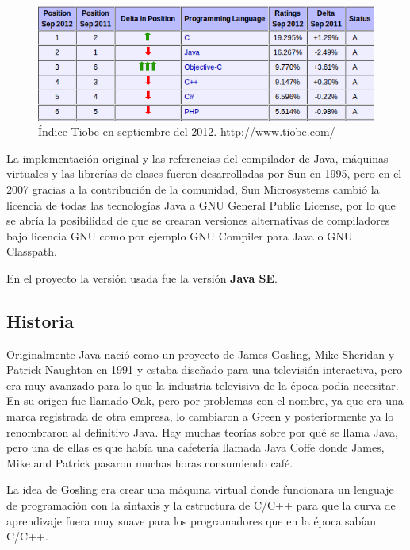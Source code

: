 \begin{figure}[h]
  \centering
    \includegraphics[scale=0.9]{./ConocimientosPrevios/imagenes/indiceTiobe.png}
  \caption{Índice Tiobe en septiembre del 2012. \url{http://www.tiobe.com/}}
  \label{fig:indicetiobe}
\end{figure} 

La implementación original y las referencias del compilador de Java, máquinas virtuales y las librerías de clases fueron desarrolladas por Sun en 1995, pero en el 2007 gracias a la contribución de la comunidad, Sun Microsystems cambió la licencia de todas las tecnologías Java a GNU General Public License, por lo que se abría la posibilidad de que se crearan versiones alternativas de compiladores bajo licencia GNU como por ejemplo GNU Compiler para Java o GNU Classpath.

En el proyecto la versión usada fue la versión \textbf{Java SE}.

\subsection{Historia}

Originalmente Java nació como un proyecto de James Gosling, Mike Sheridan y Patrick Naughton en 1991 y estaba diseñado para una televisión interactiva, pero era muy avanzado para lo que la industria televisiva de la época podía necesitar. En su origen fue llamado Oak, pero por problemas con el nombre, ya que era una marca registrada de otra empresa, lo cambiaron a Green y posteriormente ya lo renombraron al definitivo Java. Hay muchas teorías sobre por qué se llama Java, pero una de ellas es que había una cafetería llamada Java Coffe donde James, Mike and Patrick pasaron muchas horas consumiendo café.

La idea de Gosling era crear una máquina virtual donde funcionara un lenguaje de programación con la sintaxis y la estructura de C/C++ para que la curva de aprendizaje fuera muy suave para los programadores que en la época sabían C/C++.

